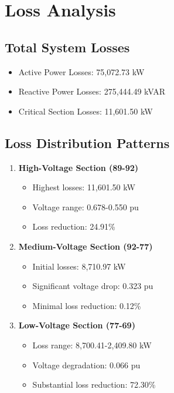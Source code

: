 \documentclass[11pt]{article}
\begin{document}
\section{Loss Analysis}

\subsection{Total System Losses}
\begin{itemize}
    \item Active Power Losses: 75,072.73 kW
    \item Reactive Power Losses: 275,444.49 kVAR
    \item Critical Section Losses: 11,601.50 kW
\end{itemize}

\subsection{Loss Distribution Patterns}
\begin{enumerate}
    \item \textbf{High-Voltage Section (89-92)}
    \begin{itemize}
        \item Highest losses: 11,601.50 kW
        \item Voltage range: 0.678-0.550 pu
        \item Loss reduction: 24.91\%
    \end{itemize}
    
    \item \textbf{Medium-Voltage Section (92-77)}
    \begin{itemize}
        \item Initial losses: 8,710.97 kW
        \item Significant voltage drop: 0.323 pu
        \item Minimal loss reduction: 0.12\%
    \end{itemize}
    
    \item \textbf{Low-Voltage Section (77-69)}
    \begin{itemize}
        \item Loss range: 8,700.41-2,409.80 kW
        \item Voltage degradation: 0.066 pu
        \item Substantial loss reduction: 72.30\%
    \end{itemize}
\end{enumerate}
\end{document}

